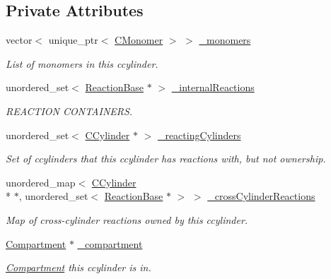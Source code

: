 \subsection*{Private Attributes}
\begin{DoxyCompactItemize}
\item 
vector$<$ unique\+\_\+ptr$<$ \hyperlink{classCMonomer}{C\+Monomer} $>$ $>$ \hyperlink{classCCylinder_a2583ee1b23a42501ece73a2a35d92a31}{\+\_\+monomers}
\begin{DoxyCompactList}\small\item\em List of monomers in this ccylinder. \end{DoxyCompactList}\item 
unordered\+\_\+set$<$ \hyperlink{classReactionBase}{Reaction\+Base} $\ast$ $>$ \hyperlink{classCCylinder_a2f377a8697a4b4e053e747287e7a6a09}{\+\_\+internal\+Reactions}
\begin{DoxyCompactList}\small\item\em R\+E\+A\+C\+T\+I\+O\+N C\+O\+N\+T\+A\+I\+N\+E\+R\+S. \end{DoxyCompactList}\item 
unordered\+\_\+set$<$ \hyperlink{classCCylinder}{C\+Cylinder} $\ast$ $>$ \hyperlink{classCCylinder_afdf5de084ef7692b8ee75b078eca384f}{\+\_\+reacting\+Cylinders}
\begin{DoxyCompactList}\small\item\em Set of ccylinders that this ccylinder has reactions with, but not ownership. \end{DoxyCompactList}\item 
unordered\+\_\+map$<$ \hyperlink{classCCylinder}{C\+Cylinder} \\*
$\ast$, unordered\+\_\+set$<$ \hyperlink{classReactionBase}{Reaction\+Base} $\ast$ $>$ $>$ \hyperlink{classCCylinder_a4263400be58cd0e11e0be99a42595c88}{\+\_\+cross\+Cylinder\+Reactions}
\begin{DoxyCompactList}\small\item\em Map of cross-\/cylinder reactions owned by this ccylinder. \end{DoxyCompactList}\item 
\hyperlink{classCompartment}{Compartment} $\ast$ \hyperlink{classCCylinder_ad8a1a406025aa82a072215aeb645c8c1}{\+\_\+compartment}
\begin{DoxyCompactList}\small\item\em \hyperlink{classCompartment}{Compartment} this ccylinder is in. \end{DoxyCompactList}\item 

\end{DoxyCompactItemize}
